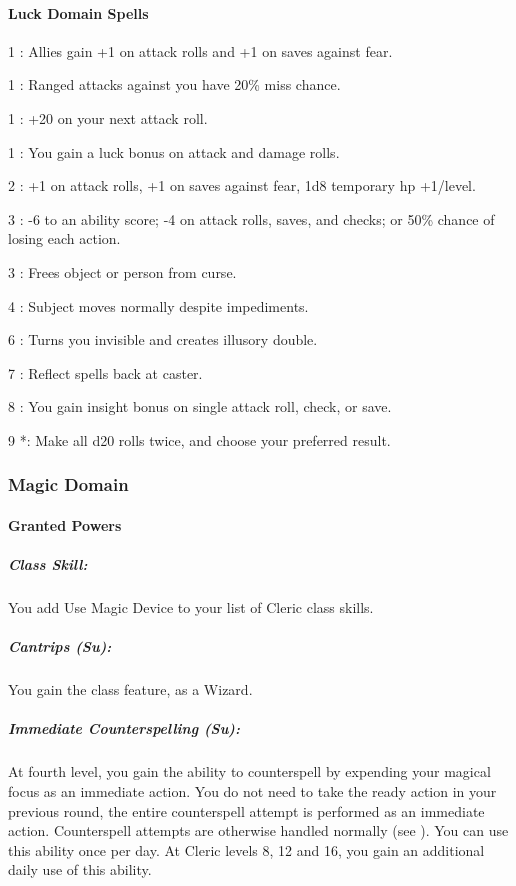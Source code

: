 \paragraph{Luck Domain Spells}
\begin{list}{}{\leftmargin=1em}
\item[1] : Allies gain +1 on attack rolls and +1 on saves against fear.
\item[1] : Ranged attacks against you have 20\% miss chance.
\item[1] : +20 on your next attack roll.
\item[1] : You gain a luck bonus on attack and damage rolls.
\item[2] : +1 on attack rolls, +1 on saves against fear, 1d8 temporary hp +1/level.
\item[3] : -6 to an ability score; -4 on attack rolls, saves, and checks; or 50\% chance of losing each action.
\item[3] : Frees object or person from curse.
\item[4] : Subject moves normally despite impediments.
\item[6] : Turns you invisible and creates illusory double.
\item[7] : Reflect spells back at caster.
\item[8] : You gain insight bonus on single attack roll, check, or save.
\item[9] *: Make all d20 rolls twice, and choose your preferred result.
\end{list}
\subsubsection{Magic Domain}
\paragraph{Granted Powers}
\subparagraph{Class Skill:}
You add Use Magic Device to your list of Cleric class skills.
\subparagraph{Cantrips (Su):}
You gain the  class feature, as a Wizard.

\subparagraph{Immediate Counterspelling (Su):} 
At fourth level, you gain the ability to counterspell by expending your magical focus as an immediate action.
You do not need to take the ready action in your previous round, the entire counterspell attempt is performed as an immediate action.
Counterspell attempts are otherwise handled normally (see ).
You can use this ability once per day. At Cleric levels 8, 12 and 16, you gain an additional daily use of this ability.
